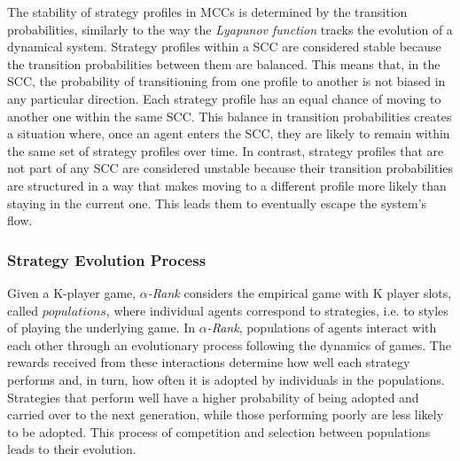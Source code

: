         \noindent
        The stability of strategy profiles in MCCs is determined by the transition probabilities, similarly to the way the \emph{Lyapunov function} tracks the evolution of a dynamical system. Strategy profiles within a SCC are considered stable because the transition probabilities between them are balanced. This means that, in the SCC, the probability of transitioning from one profile to another is not biased in any particular direction. Each strategy profile has an equal chance of moving to another one within the same SCC. This balance in transition probabilities creates a situation where, once an agent enters the SCC, they are likely to remain within the same set of strategy profiles over time. In contrast, strategy profiles that are not part of any SCC are considered unstable because their transition probabilities are structured in a way that makes moving to a different profile more likely than staying in the current one. This leads them to eventually escape the system's flow.

    \subsubsection{Strategy Evolution Process}

        Given a K-player game, \emph{$\alpha$-Rank} considers the empirical game with K player slots, called $populations$, where individual agents correspond to strategies, i.e. to styles of playing the underlying game. In \emph{$\alpha$-Rank}, populations of agents interact with each other through an evolutionary process following the dynamics of games. The rewards received from these interactions determine how well each strategy performs and, in turn, how often it is adopted by individuals in the populations. Strategies that perform well have a higher probability of being adopted and carried over to the next generation, while those performing poorly are less likely to be adopted. This process of competition and selection between populations leads to their evolution.\tinydouble


